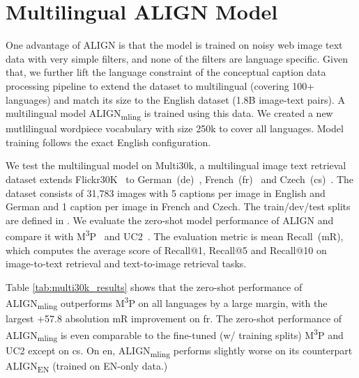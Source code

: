 \documentclass{article}
\begin{document}
\section{Multilingual ALIGN Model}

One advantage of ALIGN is that the model is trained on noisy web image text data with very simple filters, and none of the filters are language specific.
Given that, we further lift the language constraint of the conceptual caption data processing pipeline to extend the dataset to multilingual (covering 100+ languages) and match its size to the English dataset (1.8B image-text pairs).
A multilingual model ALIGN\textsubscript{mling} is trained using this data.
We created a new mutlilingual wordpiece vocabulary with size 250k to cover all languages. Model training follows the exact English configuration.

We test the multilingual model on Multi30k, a multilingual image text retrieval dataset extends Flickr30K~\cite{plummer:flickr30k} to German~(de)~\cite{multi30k-en-de}, French~(fr)~\cite{multi30k-fr} and Czech~(cs)~\cite{multi30k-cs}. The dataset consists of 31,783 images with 5 captions per image in English and German and 1 caption per image in French and Czech. The train/dev/test splits are defined in \citet{young-etal-2014-image}.
We evaluate the zero-shot model performance of ALIGN and compare it with M\textsuperscript{3}P~\cite{huang2020m3p} and UC2~\cite{zhou2021uc2}.
The evaluation metric is mean Recall~(mR), which computes the average score of Recall@1, Recall@5 and Recall@10 on image-to-text retrieval and text-to-image retrieval tasks.

Table \ref{tab:multi30k_results} shows that the zero-shot performance of ALIGN\textsubscript{mling} outperforms M\textsuperscript{3}P on all languages by a large margin, with the largest +57.8 absolution mR improvement on fr. The zero-shot performance of ALIGN\textsubscript{mling} is even comparable to the fine-tuned (w/ training splits) M\textsuperscript{3}P and UC2 except on cs. On en, ALIGN\textsubscript{mling} performs slightly worse on its counterpart ALIGN\textsubscript{EN} (trained on EN-only data.)
\end{document}
